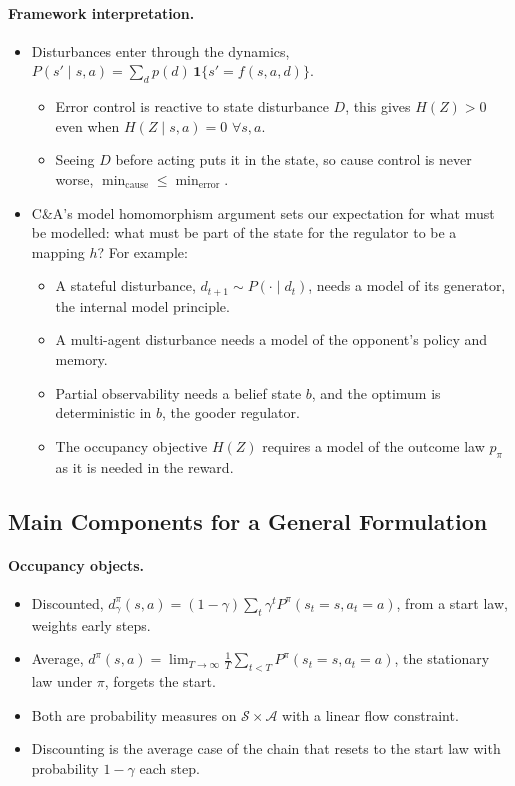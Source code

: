\documentclass[10pt]{article}
\begin{document}
\paragraph{Framework interpretation.}
\begin{itemize}
  \item Disturbances enter through the dynamics, $P(s' \mid s,a) = \sum_d p(d)\, \mathbf 1\{s' = f(s,a,d)\}$.
  \begin{itemize}
    \item Error control is reactive to state disturbance $D$, this gives $H(Z) > 0$ even when $H(Z \mid s,a) = 0$ $\forall s,a$.
    \item Seeing $D$ before acting puts it in the state, so cause control is never worse, $\min_{\mathrm{cause}} \le \min_{\mathrm{error}}$.
  \end{itemize}
  \item C\&A's model homomorphism argument sets our expectation for what must be modelled: what must be part of the state for the regulator to be a mapping $h$? For example:
  \begin{itemize}
    \item A stateful disturbance, $d_{t+1} \sim P(\cdot \mid d_t)$, needs a model of its generator, the internal model principle.
    \item A multi-agent disturbance needs a model of the opponent's policy and memory.
    \item Partial observability needs a belief state $b$, and the optimum is deterministic in $b$, the gooder regulator.
    \item The occupancy objective $H(Z)$ requires a model of the outcome law $p_\pi$ as it is needed in the reward.
  \end{itemize}
\end{itemize}



\subsection{Main Components for a General Formulation}

\paragraph{Occupancy objects.}
\begin{itemize}
  \item Discounted, $d^\pi_\gamma(s,a) = (1-\gamma)\sum_t \gamma^t P^\pi(s_t = s, a_t = a)$, from a start law, weights early steps.
  \item Average, $d^\pi(s,a) = \lim_{T \to \infty} \frac1T \sum_{t<T} P^\pi(s_t = s, a_t = a)$, the stationary law under $\pi$, forgets the start.
  \item Both are probability measures on $\mathcal S \times \mathcal A$ with a linear flow constraint.
  \item Discounting is the average case of the chain that resets to the start law with probability $1-\gamma$ each step.
\end{itemize}
\end{document}
